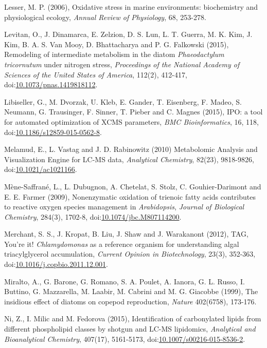 \begin{singlespace}
{{Lesser, M. P. (2006), Oxidative stress in marine environments: biochemistry and physiological ecology, \emph{Annual Review of Physiology}, 68, 253-278.

Levitan, O., J. Dinamarca, E. Zelzion, D. S. Lun, L. T. Guerra, M. K. Kim, J. Kim, B. A. S. Van Mooy, D. Bhattacharya and P. G. Falkowski (2015), Remodeling of intermediate metabolism in the diatom \emph{Phaeodactylum tricornutum }under nitrogen stress, \emph{Proceedings of the National Academy of Sciences of the United States of America}, 112(2), 412-417, doi:\href{http://dx.doi.org/10.1073/pnas.1419818112}{10.1073/pnas.1419818112}.

Libiseller, G., M. Dvorzak, U. Kleb, E. Gander, T. Eisenberg, F. Madeo, S. Neumann, G. Trausinger, F. Sinner, T. Pieber and C. Magnes (2015), IPO: a tool for automated optimization of XCMS parameters, \emph{BMC Bioinformatics}, 16, 118, doi:\href{http://dx.doi.org/10.1186/s12859-015-0562-8}{10.1186/s12859-015-0562-8}.

Melamud, E., L. Vastag and J. D. Rabinowitz (2010) Metabolomic Analysis and Visualization Engine for LC-MS data, \emph{Analytical Chemistry}, 82(23), 9818-9826, doi:\href{http://dx.doi.org/10.1021/ac1021166}{10.1021/ac1021166}.

M\`{e}ne-Saffran\'{e}, L., L. Dubugnon, A. Chetelat, S. Stolz, C. Gouhier-Darimont and E. E. Farmer (2009), Nonenzymatic oxidation of trienoic fatty acids contributes to reactive oxygen species management in \emph{Arabidopsis}, \emph{Journal of Biological Chemistry}, 284(3), 1702-8, doi:\href{http://dx.doi.org/10.1074/jbc.M807114200}{10.1074/jbc.M807114200}.

Merchant, S. S., J. Kropat, B. Liu, J. Shaw and J. Warakanont (2012), TAG, You're it! \emph{Chlamydomonas} as a reference organism for understanding algal triacylglycerol accumulation, \emph{Current Opinion in Biotechnology}, 23(3), 352-363, doi:\href{http://dx.doi.org/10.1016/j.copbio.2011.12.001}{10.1016/j.copbio.2011.12.001}.

Miralto, A., G. Barone, G. Romano, S. A. Poulet, A. Ianora, G. L. Russo, I. Buttino, G. Mazzarella, M. Laabir, M. Cabrini and M. G. Giacobbe (1999), The insidious effect of diatoms on copepod reproduction, \emph{Nature} 402(6758), 173-176.

Ni, Z., I. Milic and M. Fedorova (2015), Identification of carbonylated lipids from different phospholipid classes by shotgun and LC-MS lipidomics, \emph{Analytical and Bioanalytical Chemistry}, 407(17), 5161-5173, doi:\href{http://dx.doi.org/10.1007/s00216-015-8536-2}{10.1007/s00216-015-8536-2}.

}}
\end{singlespace}
